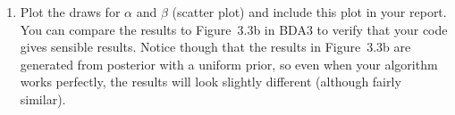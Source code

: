 \documentclass[a4paper,11pt]{article}
\begin{document}
\begin{enumerate}
\item Plot the draws for $\alpha$ and $\beta$ (scatter plot) and include this plot in your report. You can compare the results to Figure~3.3b in BDA3 to verify that your code gives sensible results. Notice though that the results in Figure~3.3b are generated from posterior with a uniform prior, so even when your algorithm works perfectly, the results will look slightly different (although fairly similar).

\end{enumerate}
\end{document}
